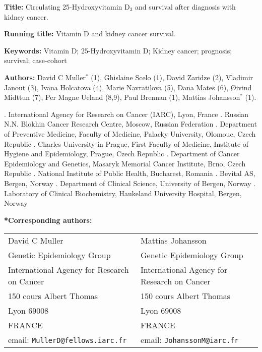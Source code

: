 \documentclass[a4paper,11pt]{article}
\begin{document}
\doublespace
\noindent \textbf{Title:} Circulating 25-Hydroxyvitamin D$_3$ and 
survival after diagnosis with kidney cancer. 

\noindent \textbf{Running title:} Vitamin D and kidney cancer survival.

\noindent \textbf{Keywords:} Vitamin D; 25-Hydroxyvitamin D; Kidney cancer; 
prognosis; survival; case-cohort

\noindent \textbf{Authors:} David C Muller$^*$ (1), Ghislaine Scelo (1),  David 
Zaridze (2), Vladimir Janout (3), Ivana Holcatova (4), Marie Navratilova (5), 
Dana Mates (6), {\O}ivind Midttun (7), Per Magne Ueland (8,9), Paul Brennan (1), 
Mattias Johansson$^*$  (1).

{\footnotesize 
{}. International Agency for Research on Cancer (IARC), Lyon, France . Russian N.N. Blokhin Cancer Research Centre, Moscow, Russian Federation 
. Department of Preventive Medicine, Faculty of Medicine, Palacky University, 
Olomouc, Czech Republic . Charles University in Prague, First Faculty of Medicine, Institute of 
Hygiene 
and Epidemiology, Prague, Czech Republic . Department of Cancer Epidemiology and Genetics, Masaryk Memorial Cancer 
Institute, Brno, Czech Republic . National Institute of Public Health, Bucharest, Romania . Bevital AS, Bergen, Norway . Department of Clinical Science, University of Bergen, Norway . Laboratory of Clinical Biochemistry, Haukeland University Hospital, Bergen, 
Norway
}

\noindent \textbf{*Corresponding authors:} 
\begin{table}[h!]
\begin{tabular}{ll}
David C Muller                  &      Mattias Johansson \\      
Genetic Epidemiology Group      &       Genetic Epidemiology Group  \\
International Agency for Research on Cancer & International Agency for Research on 
Cancer       \\
150 cours Albert Thomas         &  150 cours Albert Thomas      \\
Lyon 69008 &       Lyon 69008\\
FRANCE                     & FRANCE\\
email: \texttt{MullerD@fellows.iarc.fr} & 
email: \texttt{JohanssonM@iarc.fr}
\end{tabular}
\end{table}
\end{document}
